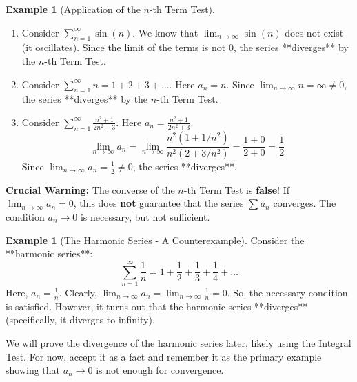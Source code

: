 \documentclass[11pt]{article}
\theoremstyle{definition}
\newtheorem{example}[theorem]{Example}
\theoremstyle{remark}
\begin{document}
\begin{example}[Application of the $n$-th Term Test]
\begin{enumerate}
    \item Consider $\sum_{n=1}^{\infty} \sin(n)$. We know that $\lim_{n \to \infty} \sin(n)$ does not exist (it oscillates). Since the limit of the terms is not 0, the series **diverges** by the $n$-th Term Test.
    \item Consider $\sum_{n=1}^{\infty} n = 1+2+3+\dots$. Here $a_n = n$. Since $\lim_{n \to \infty} n = \infty \neq 0$, the series **diverges** by the $n$-th Term Test.
    \item Consider $\sum_{n=1}^{\infty} \frac{n^2 + 1}{2n^2 + 3}$. Here $a_n = \frac{n^2+1}{2n^2+3}$.
    \[ \lim_{n \to \infty} a_n = \lim_{n \to \infty} \frac{n^2(1 + 1/n^2)}{n^2(2 + 3/n^2)} = \frac{1+0}{2+0} = \frac{1}{2} \]
    Since $\lim_{n \to \infty} a_n = \frac{1}{2} \neq 0$, the series **diverges**.
\end{enumerate}
\end{example}

\textbf{Crucial Warning:} The converse of the $n$-th Term Test is \textbf{false}!
If $\lim_{n \to \infty} a_n = 0$, this does \textbf{not} guarantee that the series $\sum a_n$ converges. The condition $a_n \to 0$ is necessary, but not sufficient.

\begin{example}[The Harmonic Series - A Counterexample] \label{ex:harmonic}
Consider the **harmonic series**:
\[ \sum_{n=1}^{\infty} \frac{1}{n} = 1 + \frac{1}{2} + \frac{1}{3} + \frac{1}{4} + \dots \]
Here, $a_n = \frac{1}{n}$. Clearly, $\lim_{n \to \infty} a_n = \lim_{n \to \infty} \frac{1}{n} = 0$.
So, the necessary condition is satisfied. However, it turns out that the harmonic series **diverges** (specifically, it diverges to infinity).

We will prove the divergence of the harmonic series later, likely using the Integral Test. For now, accept it as a fact and remember it as the primary example showing that $a_n \to 0$ is not enough for convergence.
\end{example}
\end{document}
